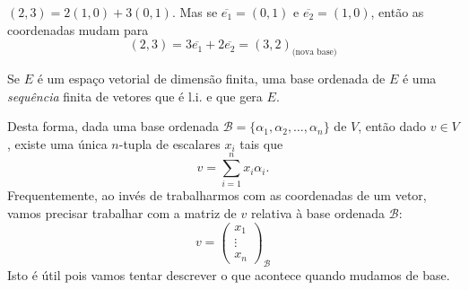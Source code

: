 \begin{exemplo*}
  $(2,3) = 2(1,0)+3(0,1)$. Mas se $\overline{e_1} = (0,1)$ e $\overline{e_2} = (1,0)$, então as coordenadas mudam para 
  \begin{equation*}
     (2,3) = 3\overline{e_1}+2\overline{e_2} = (3,2)_{\text{(nova base)}}
  \end{equation*}
\end{exemplo*}

\begin{defi}
  Se $E$ é um espaço vetorial de dimensão finita, uma base ordenada de $E$ é uma \emph{sequência} finita de vetores que é l.i. e que gera $E$.
\end{defi}

Desta forma, dada uma base ordenada ${\mathcal{B}} = \{\alpha_1,\alpha_2,\ldots,\alpha_n\}$ de $V$, então dado $v\in V$, existe uma única $n$-tupla de escalares $x_i$ tais que
\begin{equation*}
   v = \sum_{i=1}^n x_i \alpha_i.
\end{equation*}
Frequentemente, ao invés de trabalharmos com as coordenadas de um vetor, vamos precisar trabalhar com a matriz de $v$ relativa à base ordenada ${\mathcal{B}}$:
\begin{equation*}
   v =
   \begin{pmatrix}
      x_1\\\vdots\\ x_n
   \end{pmatrix}_{\mathcal{B}}
\end{equation*}
Isto é útil pois vamos tentar descrever o que acontece quando mudamos de base.

